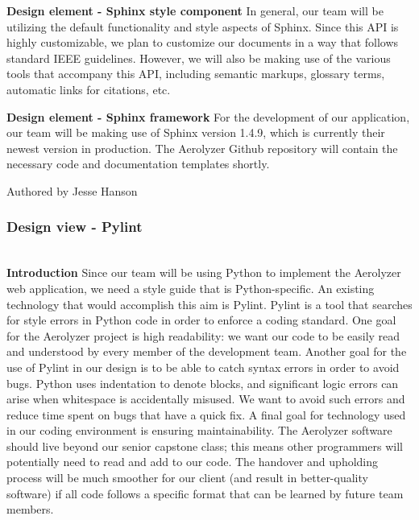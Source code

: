 \documentclass[onecolumn, draftclsnofoot,10pt, compsoc]{IEEEtran}
\begin{document}
\begin{flushleft}
\medskip

\textbf{Design element - Sphinx style component}
In general, our team will be utilizing the default functionality and style aspects of Sphinx. Since this API is highly customizable, we plan to customize our documents in a way that follows standard IEEE guidelines. However, we will also be making use of the various tools that accompany this API, including semantic markups, glossary terms, automatic links for citations, etc. \cite{17}

\medskip

\textbf{Design element - Sphinx framework}
For the development of our application, our team will be making use of Sphinx version 1.4.9, which is currently their newest version in production. \cite{17} The Aerolyzer Github repository will contain the necessary code and documentation templates shortly.

\smallskip

\footnotesize Authored by Jesse Hanson
\normalsize

\bigskip

\subsubsection{Design view - Pylint} \ \\
\textbf{Introduction} Since our team will be using Python to implement the Aerolyzer web application, we need a style guide that is Python-specific.
An existing technology that would accomplish this aim is Pylint. Pylint is a tool that searches for style errors in Python code in order to enforce a coding standard. \cite{20} One goal for the Aerolyzer project is high readability: we want our code to be easily read and understood by every member of the development team. 
Another goal for the use of Pylint in our design is to be able to catch syntax errors in order to avoid bugs. 
Python uses indentation to denote blocks, and significant logic errors can arise when whitespace is accidentally misused. 
We want to avoid such errors and reduce time spent on bugs that have a quick fix. 
A final goal for technology used in our coding environment is ensuring maintainability. The Aerolyzer software should live beyond our senior capstone class; this means other programmers will potentially need to read and add to our code. The handover and upholding process will be much smoother for our client (and result in better-quality software) if all code follows a specific format that can be learned by future team members.


\end{flushleft}
\end{document}
